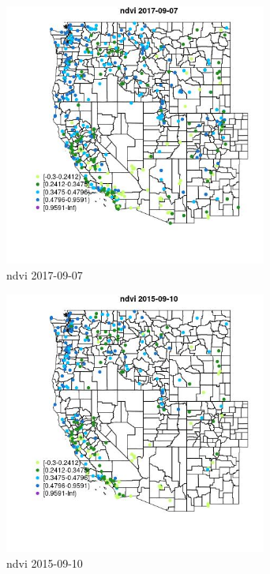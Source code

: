 \begin{figure} 
\centering  
\includegraphics[width=0.77\textwidth]{Code_Outputs/Report_ML_input_PM25_Step4_part_e_de_duplicated_aves_compiled_2019-05-21wNAs_MapObsndvi2017-09-07.jpg} 
\caption{\label{fig:Report_ML_input_PM25_Step4_part_e_de_duplicated_aves_compiled_2019-05-21wNAsMapObsndvi2017-09-07}ndvi 2017-09-07} 
\end{figure} 
 

\begin{figure} 
\centering  
\includegraphics[width=0.77\textwidth]{Code_Outputs/Report_ML_input_PM25_Step4_part_e_de_duplicated_aves_compiled_2019-05-21wNAs_MapObsndvi2015-09-10.jpg} 
\caption{\label{fig:Report_ML_input_PM25_Step4_part_e_de_duplicated_aves_compiled_2019-05-21wNAsMapObsndvi2015-09-10}ndvi 2015-09-10} 
\end{figure} 
 

